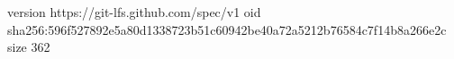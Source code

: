 version https://git-lfs.github.com/spec/v1
oid sha256:596f527892e5a80d1338723b51c60942be40a72a5212b76584c7f14b8a266e2c
size 362
